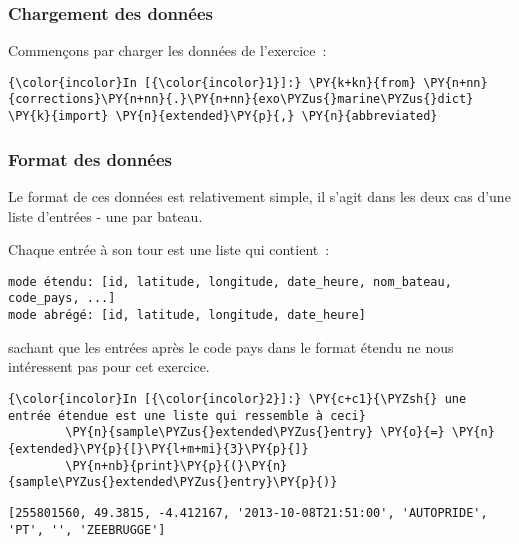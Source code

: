     \hypertarget{chargement-des-donnuxe9es}{%
\subsubsection{Chargement des données}\label{chargement-des-donnuxe9es}}

    Commençons par charger les données de l'exercice~:

    \begin{Verbatim}[commandchars=\\\{\},frame=single,framerule=0.3mm,rulecolor=\color{cellframecolor}]
{\color{incolor}In [{\color{incolor}1}]:} \PY{k+kn}{from} \PY{n+nn}{corrections}\PY{n+nn}{.}\PY{n+nn}{exo\PYZus{}marine\PYZus{}dict} \PY{k}{import} \PY{n}{extended}\PY{p}{,} \PY{n}{abbreviated}
\end{Verbatim}


    \hypertarget{format-des-donnuxe9es}{%
\subsubsection{Format des données}\label{format-des-donnuxe9es}}

    Le format de ces données est relativement simple, il s'agit dans les
deux cas d'une liste d'entrées - une par bateau.

Chaque entrée à son tour est une liste qui contient~:

\begin{verbatim}
mode étendu: [id, latitude, longitude, date_heure, nom_bateau, code_pays, ...]
mode abrégé: [id, latitude, longitude, date_heure]
\end{verbatim}

sachant que les entrées après le code pays dans le format étendu ne nous
intéressent pas pour cet exercice.

    \begin{Verbatim}[commandchars=\\\{\},frame=single,framerule=0.3mm,rulecolor=\color{cellframecolor}]
{\color{incolor}In [{\color{incolor}2}]:} \PY{c+c1}{\PYZsh{} une entrée étendue est une liste qui ressemble à ceci}
        \PY{n}{sample\PYZus{}extended\PYZus{}entry} \PY{o}{=} \PY{n}{extended}\PY{p}{[}\PY{l+m+mi}{3}\PY{p}{]}
        \PY{n+nb}{print}\PY{p}{(}\PY{n}{sample\PYZus{}extended\PYZus{}entry}\PY{p}{)}
\end{Verbatim}


    \begin{Verbatim}[commandchars=\\\{\},frame=single,framerule=0.3mm,rulecolor=\color{cellframecolor}]
[255801560, 49.3815, -4.412167, '2013-10-08T21:51:00', 'AUTOPRIDE', 'PT', '', 'ZEEBRUGGE']
\end{Verbatim}

